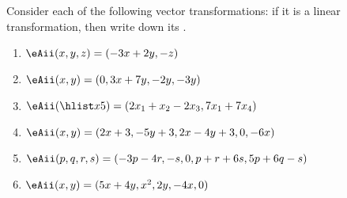\begin{exercise}  
Consider each of the following vector transformations: if it is a linear transformation, then write down its .
\begin{enumerate}
\item \(\eAii(x,y,z)=(-3x+2y,-z)\)

\item \(\eAii(x,y)=(0,3x+7y,-2y,-3y)\)

\item \(\eAii(\hlist x5)=(2x_1+x_2-2x_3,7x_1+7x_4)\)

\item \(\eAii(x,y)=(2x+3,-5y+3,2x-4y+3,0,-6x)\)

\item \(\eAii(p,q,r,s)=(-3p-4r,-s,0,p+r+6s,5p+6q-s)\)

\item \(\eAii(x,y)=(5x+4y,x^2,2y,-4x,0)\)


\end{enumerate}
\end{exercise}





